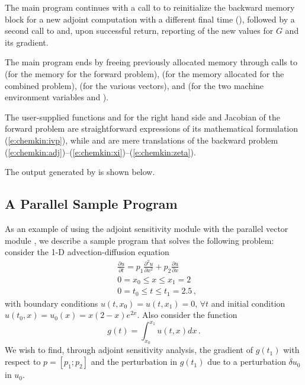 The main program continues with a call to  to reinitialize the 
backward memory block for a new adjoint computation with a different final 
time (), followed by a second call to  and, upon successful
return, reporting of the new values for $G$ and its gradient.

The main program ends by freeing previously allocated memory through calls to 
 (for the {\cvodes} memory for the forward problem),  
(for the memory allocated for the combined problem),  
(for the various vectors), and  (for the two machine 
environment variables  and ).

The user-supplied functions  and  for the right hand side and
Jacobian of the forward problem are straightforward expressions of its 
mathematical formulation (\ref{e:chemkin:ivp}), while  and 
are mere translations of the backward problem
(\ref{e:chemkin:adj})--(\ref{e:chemkin:xi})--(\ref{e:chemkin:zeta}).

The output generated by  is shown below.
{\small}


\subsection{A Parallel Sample Program}\label{ss:parallel_adj_ex}

As an example of using the {\cvodes} adjoint sensitivity module with
the parallel vector module {\nvecp}, we describe a sample program
that solves the following problem: consider the 1-D advection-diffusion
equation
\begin{equation}\label{e:pvanx:orig_pde}
  \begin{split}
    & \frac{\partial u}{\partial t} = p_1 \frac{\partial^2 u}{\partial x^2} 
    + p_2 \frac{\partial u}{\partial x} \\
    & 0 = x_0 \le x \le x_1 = 2 \\
    & 0 = t_0 \le t \le t_1 = 2.5 \, ,
  \end{split}
\end{equation}
with boundary conditions $u(t,x_0) = u(t,x_1) = 0 ,\, \forall t$
and initial condition $u(t_0 , x) = u_0(x) = x(2-x)e^{2x}$. Also
consider the function
\begin{equation*}
  g(t) = \int_{x_0}^{x_1} u(t,x) dx \, .
\end{equation*}
We wish to find, through adjoint sensitivity analysis, the gradient of
$g(t_1)$ with respect to $p = [p_1 ; p_2]$ and the perturbation in $g(t_1)$
due to a perturbation $\delta u_0$ in $u_0$.

